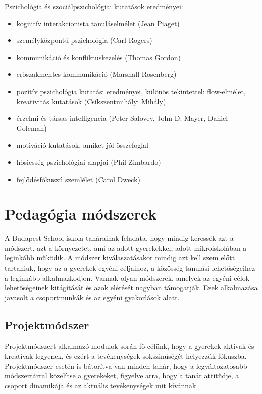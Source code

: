 Pszichológia és szociálpszichológiai kutatások eredményei:

\begin{itemize}

\item
  kognitív interakcionista tanuláselmélet (Jean Piaget)
\item
  személyközpontú pszichológia (Carl Rogers)
\item
  kommunikáció és konfliktuskezelés (Thomas Gordon)
\item
  erőszakmentes kommunikáció (Marshall Rosenberg)
\item
  pozitív pszichológia kutatási eredményei, különös tekintettel:
  flow-elmélet, kreativitás kutatások (Csíkszentmihályi Mihály)
\item
  érzelmi és társas intelligencia (Peter Salovey, John D. Mayer, Daniel Goleman)
\item motiváció kutatások, amiket jól összefoglal \citep{pink2011drive}
\item
  hősiesség pszichológiai alapjai (Phil Zimbardo)
\item
  fejlődésfókuszú szemlélet (Carol Dweck)
\end{itemize}

\section{Pedagógia
módszerek}
A Budapest School iskola tanárainak feladata, hogy mindig keressék azt a módszert, azt a környezetet, ami az adott gyerekekkel, adott mikroiskolában a leginkább működik. A módszer kiválaszatásakor mindig azt kell szem előtt tartaniuk, hogy az a gyerekek egyéni céljaihoz, a közösség tanulási lehetőségeihez a leginkább alkalmazkodjon. Vannak olyan módszerek, amelyek az egyéni célok lehetőségeinek kitágítását és azok elérését nagyban támogatják. Ezek alkalmazása javasolt a csoportmunkák és az egyéni gyakorlások alatt. 



\subsection{Projektmódszer}
Projektmódszert alkalmazó modulok során fő célünk, hogy a gyerekek aktivak és kreatívak legyenek, és ezért a tevékenységek sokszinűségét helyezzük fókuszba. Projektmódszer esetén is bátorítva van minden tanár, hogy a legváltozatosabb módszertárral közelítse a gyerekeket, figyelve arra, hogy a tanár attitűdje, a csoport dinamikája és az aktuális tevékenységek mit kívánnak.

